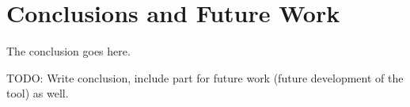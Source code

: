 \section{Conclusions and Future Work}

The conclusion goes here.

TODO: Write conclusion, include part for future work (future development of the tool) as well.
